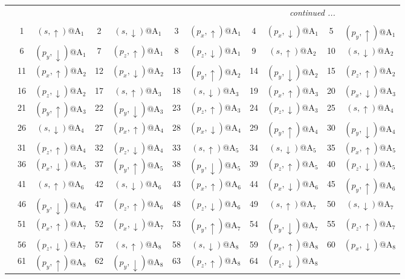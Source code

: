 \documentclass[fleqn,10pt,landscape]{article}
\begin{document}
\begin{itemize}
\begin{center}
\begin{longtable}{c|cc|cc|cc|cc|cc}
 \hline \hline
\multicolumn{10}{r}{\footnotesize\it continued ...} \\ \endfoot

 \hline \hline
\multicolumn{10}{r}{} \\ \endlastfoot

 & 1 & $(s,\uparrow)$@A$_{1}$ & 2 & $(s,\downarrow)$@A$_{1}$ & 3 & $(p_{x},\uparrow)$@A$_{1}$ & 4 & $(p_{x},\downarrow)$@A$_{1}$ & 5 & $(p_{y},\uparrow)$@A$_{1}$ \\
& 6 & $(p_{y},\downarrow)$@A$_{1}$ & 7 & $(p_{z},\uparrow)$@A$_{1}$ & 8 & $(p_{z},\downarrow)$@A$_{1}$ & 9 & $(s,\uparrow)$@A$_{2}$ & 10 & $(s,\downarrow)$@A$_{2}$ \\
& 11 & $(p_{x},\uparrow)$@A$_{2}$ & 12 & $(p_{x},\downarrow)$@A$_{2}$ & 13 & $(p_{y},\uparrow)$@A$_{2}$ & 14 & $(p_{y},\downarrow)$@A$_{2}$ & 15 & $(p_{z},\uparrow)$@A$_{2}$ \\
& 16 & $(p_{z},\downarrow)$@A$_{2}$ & 17 & $(s,\uparrow)$@A$_{3}$ & 18 & $(s,\downarrow)$@A$_{3}$ & 19 & $(p_{x},\uparrow)$@A$_{3}$ & 20 & $(p_{x},\downarrow)$@A$_{3}$ \\
& 21 & $(p_{y},\uparrow)$@A$_{3}$ & 22 & $(p_{y},\downarrow)$@A$_{3}$ & 23 & $(p_{z},\uparrow)$@A$_{3}$ & 24 & $(p_{z},\downarrow)$@A$_{3}$ & 25 & $(s,\uparrow)$@A$_{4}$ \\
& 26 & $(s,\downarrow)$@A$_{4}$ & 27 & $(p_{x},\uparrow)$@A$_{4}$ & 28 & $(p_{x},\downarrow)$@A$_{4}$ & 29 & $(p_{y},\uparrow)$@A$_{4}$ & 30 & $(p_{y},\downarrow)$@A$_{4}$ \\
& 31 & $(p_{z},\uparrow)$@A$_{4}$ & 32 & $(p_{z},\downarrow)$@A$_{4}$ & 33 & $(s,\uparrow)$@A$_{5}$ & 34 & $(s,\downarrow)$@A$_{5}$ & 35 & $(p_{x},\uparrow)$@A$_{5}$ \\
& 36 & $(p_{x},\downarrow)$@A$_{5}$ & 37 & $(p_{y},\uparrow)$@A$_{5}$ & 38 & $(p_{y},\downarrow)$@A$_{5}$ & 39 & $(p_{z},\uparrow)$@A$_{5}$ & 40 & $(p_{z},\downarrow)$@A$_{5}$ \\
& 41 & $(s,\uparrow)$@A$_{6}$ & 42 & $(s,\downarrow)$@A$_{6}$ & 43 & $(p_{x},\uparrow)$@A$_{6}$ & 44 & $(p_{x},\downarrow)$@A$_{6}$ & 45 & $(p_{y},\uparrow)$@A$_{6}$ \\
& 46 & $(p_{y},\downarrow)$@A$_{6}$ & 47 & $(p_{z},\uparrow)$@A$_{6}$ & 48 & $(p_{z},\downarrow)$@A$_{6}$ & 49 & $(s,\uparrow)$@A$_{7}$ & 50 & $(s,\downarrow)$@A$_{7}$ \\
& 51 & $(p_{x},\uparrow)$@A$_{7}$ & 52 & $(p_{x},\downarrow)$@A$_{7}$ & 53 & $(p_{y},\uparrow)$@A$_{7}$ & 54 & $(p_{y},\downarrow)$@A$_{7}$ & 55 & $(p_{z},\uparrow)$@A$_{7}$ \\
& 56 & $(p_{z},\downarrow)$@A$_{7}$ & 57 & $(s,\uparrow)$@A$_{8}$ & 58 & $(s,\downarrow)$@A$_{8}$ & 59 & $(p_{x},\uparrow)$@A$_{8}$ & 60 & $(p_{x},\downarrow)$@A$_{8}$ \\
& 61 & $(p_{y},\uparrow)$@A$_{8}$ & 62 & $(p_{y},\downarrow)$@A$_{8}$ & 63 & $(p_{z},\uparrow)$@A$_{8}$ & 64 & $(p_{z},\downarrow)$@A$_{8}$ &  &  \\
\end{longtable}
\end{center}


\end{itemize}
\end{document}
